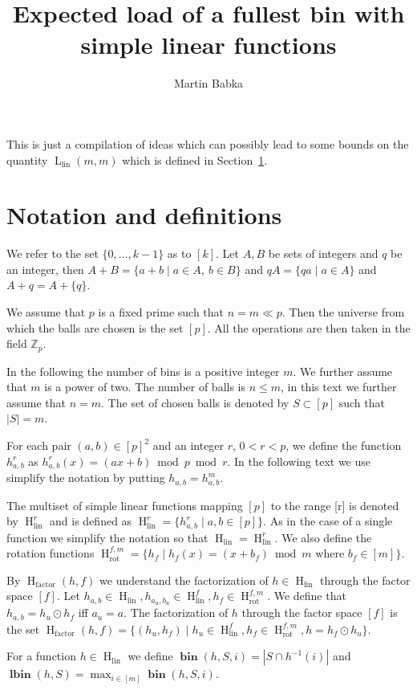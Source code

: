 \documentclass{article}
\title{Expected load of a fullest bin with simple linear functions}
\author{Martin Babka}
\newcommand{\llinnm}[2]{\operatorname{L}_{\operatorname{lin}}({#1}, {#2})}
\newcommand{\llinn}[1]{\llinnm{#1}{#1}}
\newcommand{\hlinr}[1]{\operatorname{H}_{\operatorname{lin}}^{#1}}
\newcommand{\hlin}{\operatorname{H}_{\operatorname{lin}}}
\newcommand{\hfact}[2]{\operatorname{H}_{\operatorname{factor}}({#1}, {#2})}
\newcommand{\rot}[2]{\operatorname{H}_{\operatorname{rot}}^{{#1}, {#2}}}
\newcommand{\bin}[3]{\operatorname{\mathbf{bin}}({#1}, {#2}, {#3})}
\newcommand{\lbin}[2]{\operatorname{\mathbf{lbin}}({#1}, {#2})}
\begin{document}
\maketitle

This is just a compilation of ideas which can possibly lead to some bounds on the quantity $\llinn{m}$ which is defined in Section~\ref{sec:notation}.

\section{Notation and definitions}
\label{sec:notation}
We refer to the set $\{0, \dots, k - 1\}$ as to $[k]$.
Let $A, B$ be sets of integers and $q$ be an integer, then $A + B = \{a + b \mid a \in A,\ b \in B\}$ and $qA = \{qa \mid a \in A \}$ and $A + q = A + \{q\}$.

We assume that $p$ is a fixed prime such that $n = m \ll p$.
Then the universe from which the balls are chosen is the set $[p]$.
All the operations are then taken in the field $\mathbb{Z}_p$.

In the following the number of bins is a positive integer $m$.
We further assume that $m$ is a power of two.
The number of balls is $n \leq m$, in this text we further assume that $n = m$.
The set of chosen balls is denoted by $S \subset [p]$ such that $|S| = m$.

For each pair $(a, b) \in [p]^2$ and an integer $r$, $0 < r < p$, we define the function $h_{a, b}^r$ as $h_{a, b}^r(x) = (ax + b) \bmod p \bmod r$.
In the following text we use simplify the notation by putting $h_{a, b} = h_{a, b}^m$.

The multiset of simple linear functions mapping $[p]$ to the range [r] is denoted by $\hlinr{r}$ and is defined as $\hlinr{r} = \{h_{a, b}^r \mid a, b \in [p] \}$.
As in the case of a single function we simplify the notation so that $\hlin = \hlinr{r}$.
We also define the rotation functions $\rot{f}{m} = \{h_f \mid h_f(x) = (x + b_f) \bmod m \text{ where } b_f \in [m] \}$.

By $\hfact{h}{f}$ we understand the factorization of $h \in \hlin$ through the factor space $[f]$.
Let $h_{a, b} \in \hlin, h_{a_u, b_u} \in \hlinr{f}, h_f \in \rot{f}{m}$.
We define that $h_{a, b} = h_u \odot h_f$ iff $a_u = a$.
The factorization of $h$ through the factor space $[f]$ is the set $\hfact{h}{f} = \{ (h_u, h_f) \mid h_u \in \hlinr{f}, h_f \in \rot{f}{m}, h = h_f \odot h_u \}.$

For a function $h \in \hlin$ we define $\bin{h}{S}{i} = |S \cap h^{-1}(i)|$ and $\lbin{h}{S} = \max_{i \in [m]} \bin{h}{S}{i}$.
\end{document}
